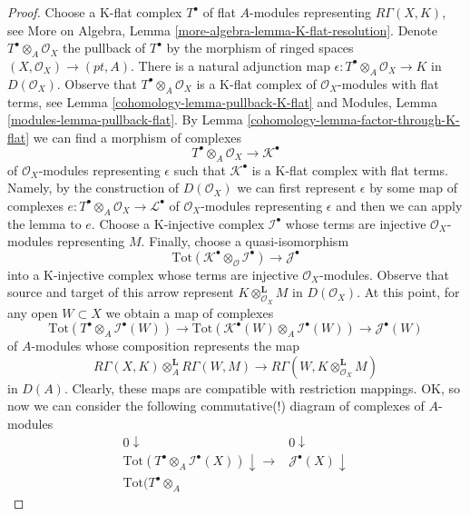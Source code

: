 \begin{proof}

Choose a K-flat complex $T^\bullet$ of flat $A$-modules representing
$R\Gamma(X, K)$, see
More on Algebra, Lemma \ref{more-algebra-lemma-K-flat-resolution}.
Denote $T^\bullet \otimes_A \mathcal{O}_X$ the pullback of $T^\bullet$
by the morphism of ringed spaces $(X, \mathcal{O}_X) \to (pt, A)$.
There is a natural adjunction map
$\epsilon : T^\bullet \otimes_A \mathcal{O}_X \to K$ in $D(\mathcal{O}_X)$.
Observe that $T^\bullet \otimes_A \mathcal{O}_X$ is a K-flat
complex of $\mathcal{O}_X$-modules with flat terms, see
Lemma \ref{cohomology-lemma-pullback-K-flat} and
Modules, Lemma \ref{modules-lemma-pullback-flat}.
By Lemma \ref{cohomology-lemma-factor-through-K-flat} we can find a morphism of complexes
$$
T^\bullet \otimes_A \mathcal{O}_X \longrightarrow \mathcal{K}^\bullet
$$
of $\mathcal{O}_X$-modules representing $\epsilon$
such that $\mathcal{K}^\bullet$ is a
K-flat complex with flat terms. Namely, by the construction of
$D(\mathcal{O}_X)$ we can first represent $\epsilon$ by some map of complexes
$e : T^\bullet \otimes_A \mathcal{O}_X \to \mathcal{L}^\bullet$
of $\mathcal{O}_X$-modules representing $\epsilon$
and then we can apply the lemma to $e$. Choose a K-injective
complex $\mathcal{I}^\bullet$ whose terms are injective $\mathcal{O}_X$-modules
representing $M$. Finally, choose a quasi-isomorphism
$$
\text{Tot}(\mathcal{K}^\bullet \otimes_\mathcal{O} \mathcal{I}^\bullet)
\longrightarrow
\mathcal{J}^\bullet
$$
into a K-injective complex whose terms are injective $\mathcal{O}_X$-modules.
Observe that source and target of this arrow represent
$K \otimes_{\mathcal{O}_X}^\mathbf{L} M$ in $D(\mathcal{O}_X)$.
At this point, for any open $W \subset X$ we obtain a map of complexes
$$
\text{Tot}(T^\bullet \otimes_A \mathcal{I}^\bullet(W))
\to
\text{Tot}(\mathcal{K}^\bullet(W) \otimes_A \mathcal{I}^\bullet(W))
\to
\mathcal{J}^\bullet(W)
$$
of $A$-modules whose composition represents the map
$$
R\Gamma(X, K) \otimes_A^\mathbf{L} R\Gamma(W, M)
\longrightarrow
R\Gamma(W, K \otimes_{\mathcal{O}_X}^\mathbf{L} M)
$$
in $D(A)$. Clearly, these maps are compatible with restriction mappings.
OK, so now we can consider the following commutative(!) diagram
of complexes of $A$-modules
$$
\begin{array}{cc}0 \downarrow & 0 \downarrow \\ \text{Tot}(T^\bullet \otimes_A \mathcal{I}^\bullet(X)) \downarrow\longrightarrow & \mathcal{J}^\bullet(X) \downarrow \\ \text{Tot}(T^\bullet \otimes_A

\end{array}$$
\end{proof}
